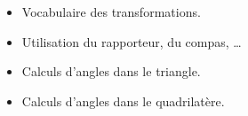 \begin{prerequis}[Prérequis]    
    \begin{itemize}
        \item Vocabulaire des transformations.
        \item Utilisation du rapporteur, du compas, \dots
        \item Calculs d'angles dans le triangle.
        \item Calculs d'angles dans le quadrilatère.
    \end{itemize}
\end{prerequis}
